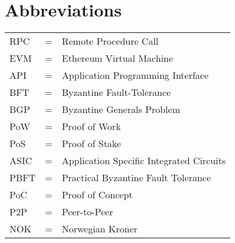 \chapter*{Abbreviations}

\noindent 
\begin{center}
\begin{tabular}{ l c l }
   RPC & = & Remote Procedure Call \\
   EVM & = & Ethereum Virtual Machine \\
   API & = & Application Programming Interface \\
   BFT & = & Byzantine Fault-Tolerance \\
   BGP & = & Byzantine Generals Problem \\
   PoW & = & Proof of Work \\
   PoS & = & Proof of Stake \\
   ASIC & = & Application Specific Integrated Circuits \\
   PBFT & = & Practical Byzantine Fault Tolerance \\
   PoC & = & Proof of Concept \\
   P2P & = & Peer-to-Peer \\
   NOK & = & Norwegian Kroner \\
   
   
   
   


\end{tabular}
\end{center}

